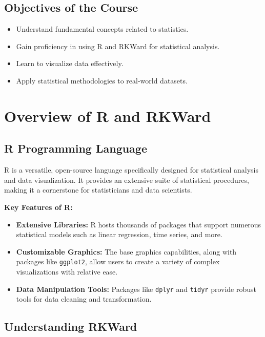 \documentclass[
  letterpaper,
  DIV=11,
  numbers=noendperiod]{scrreprt}
\providecommand{\tightlist}{%
  \setlength{\itemsep}{0pt}\setlength{\parskip}{0pt}}
\begin{document}
\section{Objectives of the Course}\label{objectives-of-the-course}

\begin{itemize}
\tightlist
\item
  Understand fundamental concepts related to statistics.
\item
  Gain proficiency in using R and RKWard for statistical analysis.
\item
  Learn to visualize data effectively.
\item
  Apply statistical methodologies to real-world datasets.
\end{itemize}


\chapter{Overview of R and RKWard}\label{overview-of-r-and-rkward}

\section{R Programming Language}\label{r-programming-language}

R is a versatile, open-source language specifically designed for
statistical analysis and data visualization. It provides an extensive
suite of statistical procedures, making it a cornerstone for
statisticians and data scientists.

\textbf{Key Features of R:}

\begin{itemize}
\tightlist
\item
  \textbf{Extensive Libraries:} R hosts thousands of packages that
  support numerous statistical models such as linear regression, time
  series, and more.
\item
  \textbf{Customizable Graphics:} The base graphics capabilities, along
  with packages like \texttt{ggplot2}, allow users to create a variety
  of complex visualizations with relative ease.
\item
  \textbf{Data Manipulation Tools:} Packages like \texttt{dplyr} and
  \texttt{tidyr} provide robust tools for data cleaning and
  transformation.
\end{itemize}

\section{Understanding RKWard}\label{understanding-rkward}
\end{document}
